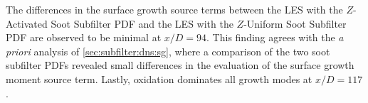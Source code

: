 The differences in the surface growth source terms between the LES with the $Z$-Activated Soot Subfilter PDF and the LES with the $Z$-Uniform Soot Subfilter PDF are observed to be minimal at $x/D = 94$. This finding agrees with the \textit{a priori} analysis of \cref{sec:subfilter:dns:sg}, where a comparison of the two soot subfilter PDFs revealed small differences in the evaluation of the surface growth moment source term. Lastly, oxidation dominates all growth modes at $x/D = 117$. %


